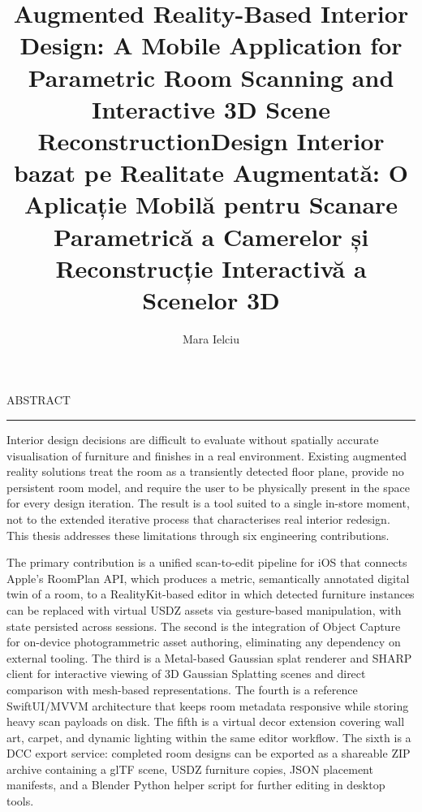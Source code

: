\documentclass[12pt]{report}
\begin{document}
\title{Augmented Reality-Based Interior Design: A Mobile Application for Parametric Room Scanning and Interactive 3D Scene Reconstruction}					   
\author{Mara Ielciu}											
				
\maketitle
\newpage


\title{Design Interior bazat pe Realitate Augmentată: O Aplicație Mobilă pentru Scanare Parametrică a Camerelor și Reconstrucție Interactivă a Scenelor 3D}

\maketitle
\newpage

\thispagestyle{empty}
\mbox{}
\newpage
{} 

\cleardoublepage
ABSTRACT
\vspace{0.5cm}	
\hrule
\vspace{0.5cm}	

Interior design decisions are difficult to evaluate without spatially accurate visualisation of furniture and finishes in a real environment. Existing augmented reality solutions treat the room as a transiently detected floor plane, provide no persistent room model, and require the user to be physically present in the space for every design iteration. The result is a tool suited to a single in-store moment, not to the extended iterative process that characterises real interior redesign. This thesis addresses these limitations through six engineering contributions.

The primary contribution is a unified scan-to-edit pipeline for iOS that connects Apple's RoomPlan API, which produces a metric, semantically annotated digital twin of a room, to a RealityKit-based editor in which detected furniture instances can be replaced with virtual USDZ assets via gesture-based manipulation, with state persisted across sessions. The second is the integration of Object Capture for on-device photogrammetric asset authoring, eliminating any dependency on external tooling. The third is a Metal-based Gaussian splat renderer and SHARP client for interactive viewing of 3D Gaussian Splatting scenes and direct comparison with mesh-based representations. The fourth is a reference SwiftUI/MVVM architecture that keeps room metadata responsive while storing heavy scan payloads on disk. The fifth is a virtual decor extension covering wall art, carpet, and dynamic lighting within the same editor workflow. The sixth is a DCC export service: completed room designs can be exported as a shareable ZIP archive containing a glTF scene, USDZ furniture copies, JSON placement manifests, and a Blender Python helper script for further editing in desktop tools.
\end{document}
